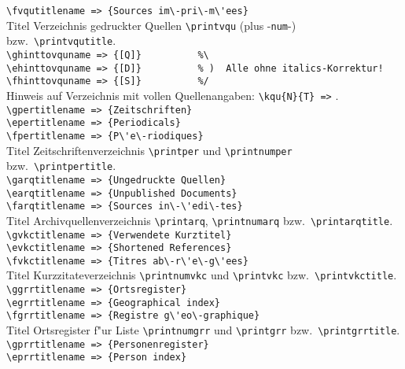 \documentclass[12pt,a4paper]{article}
\begin{document}
{\verb|\fvqutitlename => {Sources im\-pri\-m\'ees}| \\[-.2ex]
Titel Verzeichnis gedruckter Quellen \verb|\printvqu| (plus -\verb|num|-) bzw.\ \verb|\printvqutitle|.
\\[.8ex]%
\verb|\ghinttovquname => {[Q]}          %\| \\[-.8ex]
\verb|\ehinttovquname => {[D]}          % )  Alle ohne italics-Korrektur!| \\[-.8ex]
\verb|\fhinttovquname => {[S]}          %/| \\[-.2ex]
Hinweis auf Verzeichnis mit vollen Quellenangaben: \verb|\kqu{N}{T} =>| .
\\[.8ex]%
\verb|\gpertitlename => {Zeitschriften}| \\[-.8ex]
\verb|\epertitlename => {Periodicals}| \\[-.8ex]
\verb|\fpertitlename => {P\'e\-riodiques}| \\[-.2ex]
Titel Zeitschriftenverzeichnis \verb|\printper| und \verb|\printnumper| bzw.\ \verb|\printpertitle|.
\\[.8ex]%
\verb|\garqtitlename => {Ungedruckte Quellen}| \\[-.8ex]
\verb|\earqtitlename => {Unpublished Documents}| \\[-.8ex]
\verb|\farqtitlename => {Sources in\-\'edi\-tes}| \\[-.2ex]
Titel Archivquellenverzeichnis \verb|\printarq|,  \verb|\printnumarq| bzw.\ \verb|\printarqtitle|.
\\[.8ex]%
\verb|\gvkctitlename => {Verwendete Kurztitel}| \\[-.8ex]
\verb|\evkctitlename => {Shortened References}| \\[-.8ex]
\verb|\fvkctitlename => {Titres ab\-r\'e\-g\'ees}| \\[-.2ex]
Titel Kurzzitateverzeichnis \verb|\printnumvkc| und \verb|\printvkc| bzw.\ \verb|\printvkctitle|.
\\[.8ex]%
\verb|\ggrrtitlename => {Ortsregister}| \\[-.8ex]
\verb|\egrrtitlename => {Geographical index}| \\[-.8ex]
\verb|\fgrrtitlename => {Registre g\'eo\-graphique}| \\[-.2ex]
Titel Ortsregister f"ur Liste \verb|\printnumgrr| und \verb|\printgrr| bzw.\ \verb|\printgrrtitle|.
\\[.8ex]%
\verb|\gprrtitlename => {Personenregister}| \\[-.8ex]
\verb|\eprrtitlename => {Person index}| \\[-.8ex]
}
\end{document}
